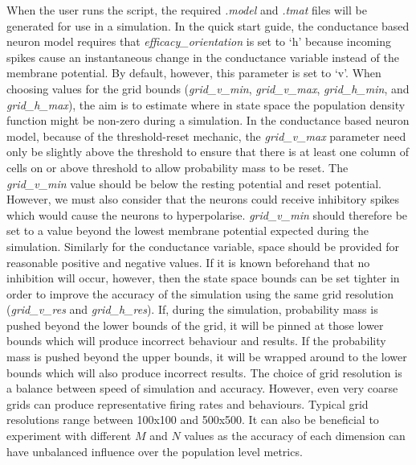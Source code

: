 \documentclass[utf8]{frontiersSCNS} %
\begin{document}
When the user runs the script, the required \textit{.model} and \textit{.tmat} files will be generated for use in a simulation. In the quick start guide, the conductance based neuron model requires that \textit{efficacy\_orientation} is set to `h' because incoming spikes cause an instantaneous change in the conductance variable instead of the membrane potential. By default, however, this parameter is set to `v'. When choosing values for the grid bounds (\textit{grid\_v\_min}, \textit{grid\_v\_max}, \textit{grid\_h\_min}, and \textit{grid\_h\_max}), the aim is to estimate where in state space the population density function might be non-zero during a simulation. In the conductance based neuron model, because of the threshold-reset mechanic, the \textit{grid\_v\_max} parameter need only be slightly above the threshold to ensure that there is at least one column of cells on or above threshold to allow probability mass to be reset. The \textit{grid\_v\_min} value should be below the resting potential and reset potential. However, we must also consider that the neurons could receive inhibitory spikes which would cause the neurons to hyperpolarise. \textit{grid\_v\_min} should therefore be set to a value beyond the lowest membrane potential expected during the simulation. Similarly for the conductance variable, space should be provided for reasonable positive and negative values. If it is known beforehand that no inhibition will occur, however, then the state space bounds can be set tighter in order to improve the accuracy of the simulation using the same grid resolution (\textit{grid\_v\_res} and \textit{grid\_h\_res}). If, during the simulation, probability mass is pushed beyond the lower bounds of the grid, it will be pinned at those lower bounds which will produce incorrect behaviour and results. If the probability mass is pushed beyond the upper bounds, it will be wrapped around to the lower bounds which will also produce incorrect results. The choice of grid resolution is a balance between speed of simulation and accuracy. However, even very coarse grids can produce representative firing rates and behaviours. Typical grid resolutions range between 100x100 and 500x500. It can also be beneficial to experiment with different $M$ and $N$ values as the accuracy of each dimension can have unbalanced influence over the population level metrics. \\
\end{document}
